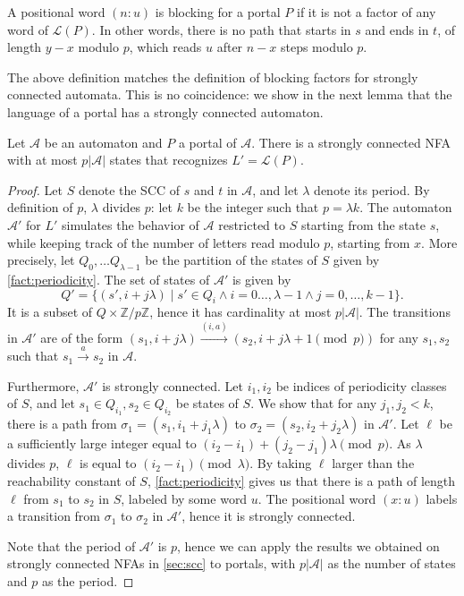 \documentclass[letterpaper, USenglish, cleveref, autoref, thm-restate, numberwithinsect]{lipics-v2021}
\theoremstyle{theorem}
\theoremstyle{definition}
\newcommand{\Aa}{\mathcal{A}}
\newcommand{\lang}[1]{\mathcal{L}(#1)}
\newcommand{\set}[1]{\{ #1 \}}
\newcommand{\timedword}[2]{(#1:#2)}
\newcommand{\ZZ}{\mathbb{Z}}
\begin{document}
\begin{definition}
	A positional word $\timedword{n}{u}$ is blocking for a portal $P$ if it is not a factor of any word of $\lang{P}$.
	In other words, there is no path that starts in $s$ and ends in $t$, of length $y-x$ modulo $p$, which reads $u$ after $n-x$ steps modulo $p$.
\end{definition}

The above definition matches the definition of blocking factors for strongly connected automata. This is no coincidence: we show in the next lemma that the language of a portal has a strongly connected automaton.
\begin{lemma}\label{lemma:portal-to-SC}
    Let $\Aa$ be an automaton and $P$ a portal of $\Aa$.
    There is a strongly connected NFA with at most $p|\Aa|$ states that recognizes $L' = \lang{P}$.
\end{lemma}
\begin{proof}
    Let $S$ denote the SCC of $s$ and $t$ in $\Aa$, and let $\lambda$ denote its period. By definition of $p$, $\lambda$ divides $p$: let $k$ be the integer such that $p = \lambda k$.
    The automaton $\Aa'$ for $L'$ simulates the behavior of $\Aa$ restricted to $S$ starting from the state $s$, while keeping track of the number of letters read modulo $p$, starting from $x$.
    More precisely, let $Q_0,\ldots Q_{\lambda-1}$ be the partition of the states of $S$ given by \cref{fact:periodicity}.
    The set of states of $\Aa'$ is given by
    \[Q' = \set{(s', i + j\lambda) \mid s'\in Q_i \land i=0\ldots,\lambda-1 \land j = 0,\ldots, k-1}.\]
    It is a subset of $Q \times \ZZ/p\ZZ$, hence it has cardinality at most $p|\Aa|$.
    The transitions in $\Aa'$ are of the form $(s_1, i+j\lambda)\xrightarrow{(i,a)} (s_2, i+j\lambda+1\pmod{p})$
    for any $s_1,s_2$ such that $s_1\xrightarrow{a}s_2$ in $\Aa$. 
    
    Furthermore, $\Aa'$ is strongly connected.
    Let $i_1,i_2$ be indices of periodicity classes of $S$, and let $s_1\in Q_{i_1}, s_2\in Q_{i_2}$ be states of $S$.
    We show that for any $j_1,j_2 < k$, there is a path from $\sigma_1 = (s_1, i_1+j_1\lambda)$ to $\sigma_2 = (s_2, i_2+j_2\lambda)$ in $\Aa'$.
    Let $\ell$ be a sufficiently large integer equal to $(i_2-i_1)+(j_2-j_1)\lambda \pmod{p}$.
    As $\lambda$ divides $p$, $\ell$ is equal to $(i_2-i_1)\pmod{\lambda}$.
    By taking $\ell$ larger than the reachability constant of $S$, \cref{fact:periodicity} gives us that there is a path of length $\ell$ from $s_1$ to $s_2$ in $S$, labeled by some word $u$.
    The positional word $\timedword{x}{u}$ labels a transition from $\sigma_1$ to $\sigma_2$ in $\Aa'$, hence it is strongly connected.
    
    Note that the period of $\Aa'$ is $p$, hence we can apply the results we obtained on strongly connected NFAs in \cref{sec:scc} to portals, with $p |\Aa|$ as the number of states and $p$ as the period.
\end{proof}
\end{document}

